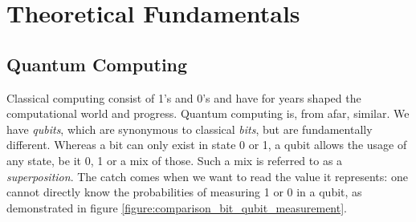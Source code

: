 \chapter{Theoretical Fundamentals} %

\label{chapter:theoretical_fundamentals} %

\def \blochwidth {0.4}
\def \qspherewidth {0.5}
\def \histogramwidth {0.4}
\newcommand{\bloch}{\emph{Bloch}-Sphere}
\newcommand{\qsphere}{Q-Sphere}
\newcommand{\hgate}{$\mathrm{H}$-Gate}
\newcommand{\xgate}{$\mathrm{X}$-Gate}
\newcommand{\ygate}{$\mathrm{Y}$-Gate}
\newcommand{\zgate}{$\mathrm{Z}$-Gate}
\newcommand{\rygate}{$\mathrm{RY}$-Gate}
\newcommand{\rzgate}{$\mathrm{RZ}$-Gate}
\newcommand{\rxgate}{$\mathrm{RX}$-Gate}
\newcommand{\crygate}{$\mathrm{CRY}$-Gate}
\newcommand{\crzgate}{$\mathrm{CRZ}$-Gate}
\newcommand{\crxgate}{$\mathrm{CRX}$-Gate}
\newcommand{\frenchquotes}[1]{«~#1~»}

\section{Quantum Computing}
Classical computing consist of 1's and 0's and have for years shaped the computational world and progress. Quantum computing is, from afar, similar. We have \emph{qubits}, which are synonymous to classical \emph{bits}, but are fundamentally different. Whereas a bit can only exist in state 0 or 1, a qubit allows the usage of any state, be it 0, 1 or a mix of those. Such a mix is referred to as a \emph{superposition}\cite{gudder_superposition_1970}. The catch comes when we want to read the value it represents: one cannot directly know the probabilities of measuring 1 or 0 in a qubit, as demonstrated in figure \ref{figure:comparison_bit_qubit_measurement}.

